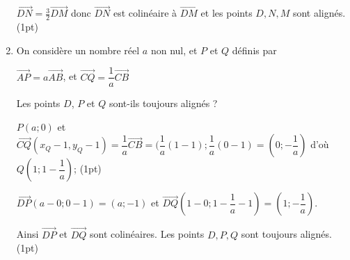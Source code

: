 \documentclass[a4paper,11pt]{article}
\theoremstyle{break}
\begin{document}
\begin{exo}
\begin{enumerate}
\begin{correction}
$\vec{DN}=\frac{3}{2}\vec{DM}$ donc $\vec{DN}$ est colin\'eaire \`a $\vec{DM}$ et les points $D,N,M$ sont align\'es. (1pt)
\end{correction}

\item On considère un nombre réel $a$ non nul, et $P$ et $Q$ définis par
      \begin{center} $\overrightarrow{AP}=a\overrightarrow{AB}$, \hspace{0.2cm} et $\overrightarrow{CQ}=\dfrac{1}{a}\overrightarrow{CB}$ \end{center}
      Les points $D$, $P$ et $Q$ sont-ils toujours alignés ?
      
\begin{correction}

$P(a;0)$ et $\vec{CQ}(x_Q-1,y_Q-1)=\dfrac{1}{a}\vec{CB}=(\dfrac{1}{a}(1-1);\dfrac{1}{a}(0-1)=(0;-\dfrac{1}{a})$ d'o\`u 
$Q(1;1-\dfrac{1}{a})$; (1pt)

$\vec{DP}(a-0;0-1)=(a;-1)$ et $\vec{DQ}(1-0;1-\dfrac{1}{a}-1)=(1;-\dfrac{1}{a})$.

Ainsi $\vec{DP}$ et $\vec{DQ}$ sont colin\'eaires. Les points $D,P,Q$ sont toujours align\'es. (1pt)
\end{correction}

\end{enumerate}

% 

  \end{exo}
  
   ~
  \vspace{0.5cm}
  
\end{document}
